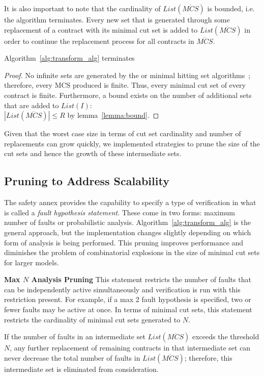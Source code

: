 It is also important to note that the cardinality of $\mathit{List(\overline{MCS})}$ is bounded, i.e. the algorithm terminates. Every new set that is generated through some replacement of a contract with its minimal cut set is added to $\mathit{List(\overline{MCS})}$ in order to continue the replacement process for all contracts in $\mathit{\overline{MCS}}$. 
\begin{theorem}
Algorithm~\ref{alg:transform_alg} terminates
\begin{proof}
No infinite sets are generated by the \aivcalg or minimal hitting set algorithms~\cite{Ghassabani2017EfficientGO,murakami2013efficient}; therefore, every MCS produced is finite. Thus, every minimal cut set of every contract is finite. Furthermore, a bound exists on the number of additional sets that are added to $List(I)$: \\
$|\mathit{List(\overline{MCS})}| \leq R$ by lemma~\ref{lemma:bound}.
\end{proof}
\end{theorem}

Given that the worst case size in terms of cut set cardinality and number of replacements can grow quickly, we implemented strategies to prune the size of the cut sets and hence the growth of these intermediate sets. 


\subsection{Pruning to Address Scalability}
The safety annex provides the capability to specify a type of verification in what is called a \textit{fault hypothesis statement}. These come in two forms: maximum number of faults or probabilistic analysis. Algorithm~\ref{alg:transform_alg} is the general approach, but the implementation changes slightly depending on which form of analysis is being performed. This pruning improves performance and diminishes the problem of combinatorial explosions in the size of minimal cut sets for larger models. 

\textbf{Max $N$ Analysis Pruning} This statement restricts the number of faults that can be independently active simultaneously and verification is run with this restriction present. For example, if a max 2 fault hypothesis is specified, two or fewer faults may be active at once. In terms of minimal cut sets, this statement restricts the cardinality of minimal cut sets generated to $N$.

If the number of faults in an intermediate set $\mathit{List(\overline{MCS})}$ exceeds the threshold $N$, any further replacement of remaining contracts in that intermediate set can never decrease the total number of faults in $\mathit{List(\overline{MCS})}$; therefore, this intermediate set is eliminated from consideration.

